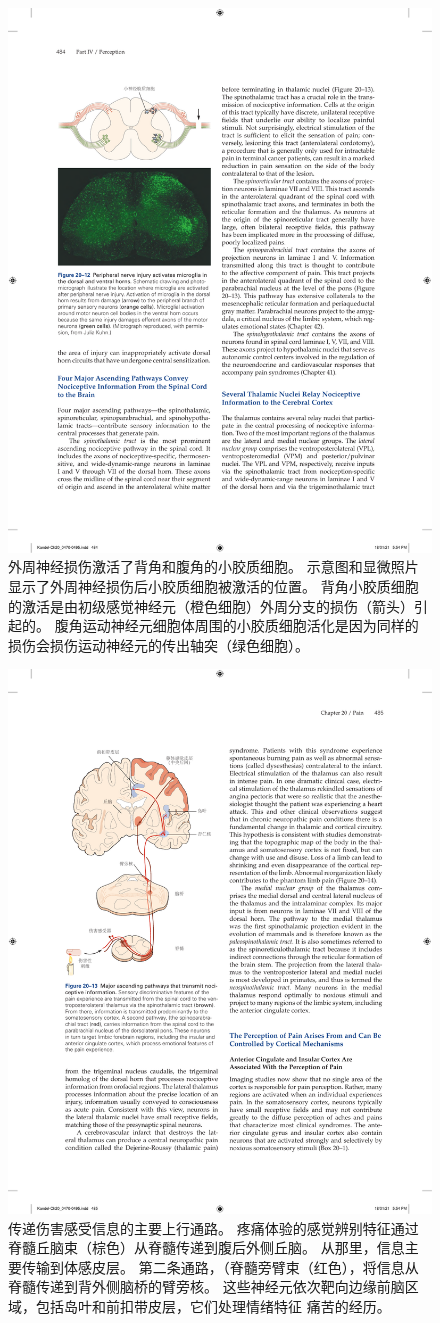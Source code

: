 \begin{figure}[htbp]
	\centering
	\includegraphics[width=0.65\linewidth]{chap20/fig_20_12}
	\caption{外周神经损伤激活了背角和腹角的小胶质细胞。
		示意图和显微照片显示了外周神经损伤后小胶质细胞被激活的位置。
		背角小胶质细胞的激活是由初级感觉神经元（橙色细胞）外周分支的损伤（箭头）引起的。
		腹角运动神经元细胞体周围的小胶质细胞活化是因为同样的损伤会损伤运动神经元的传出轴突（绿色细胞）。}
	\label{fig:20_12}
\end{figure}


\begin{figure}[htbp]
	\centering
	\includegraphics[width=0.65\linewidth]{chap20/fig_20_13}
	\caption{传递伤害感受信息的主要上行通路。
		疼痛体验的感觉辨别特征通过脊髓丘脑束（棕色）从脊髓传递到腹后外侧丘脑。
		从那里，信息主要传输到体感皮层。
		第二条通路，（脊髓旁臂束（红色），将信息从脊髓传递到背外侧脑桥的臂旁核。
		这些神经元依次靶向边缘前脑区域，包括岛叶和前扣带皮层，它们处理情绪特征 痛苦的经历。}
	\label{fig:20_13}
\end{figure}


